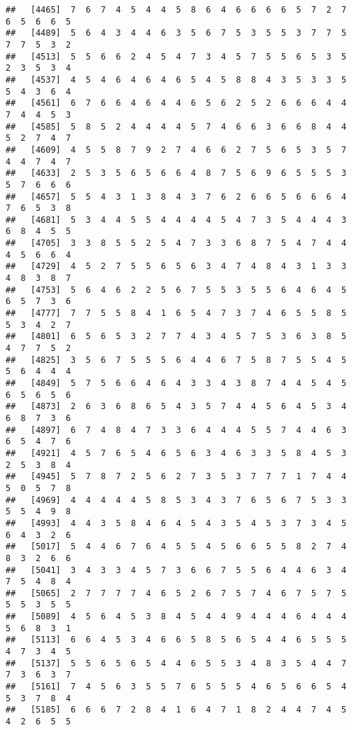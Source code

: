 \documentclass[
]{book}
\begin{document}
\begin{verbatim}
##   [4465]  7  6  7  4  5  4  4  5  8  6  4  6  6  6  6  5  7  2  7  6  5  6  6  5
##   [4489]  5  6  4  3  4  4  6  3  5  6  7  5  3  5  5  3  7  7  5  7  7  5  3  2
##   [4513]  5  5  6  6  2  4  5  4  7  3  4  5  7  5  5  6  5  3  5  2  3  5  3  4
##   [4537]  4  5  4  6  4  6  4  6  5  4  5  8  8  4  3  5  3  3  5  5  4  3  6  4
##   [4561]  6  7  6  6  4  6  4  4  6  5  6  2  5  2  6  6  6  4  4  7  4  4  5  3
##   [4585]  5  8  5  2  4  4  4  4  5  7  4  6  6  3  6  6  8  4  4  5  2  7  4  7
##   [4609]  4  5  5  8  7  9  2  7  4  6  6  2  7  5  6  5  3  5  7  4  4  7  4  7
##   [4633]  2  5  3  5  6  5  6  6  4  8  7  5  6  9  6  5  5  5  3  5  7  6  6  6
##   [4657]  5  5  4  3  1  3  8  4  3  7  6  2  6  6  5  6  6  6  4  7  6  5  3  8
##   [4681]  5  3  4  4  5  5  4  4  4  4  5  4  7  3  5  4  4  4  3  6  8  4  5  5
##   [4705]  3  3  8  5  5  2  5  4  7  3  3  6  8  7  5  4  7  4  4  4  5  6  6  4
##   [4729]  4  5  2  7  5  5  6  5  6  3  4  7  4  8  4  3  1  3  3  4  8  3  8  7
##   [4753]  5  6  4  6  2  2  5  6  7  5  5  3  5  5  6  4  6  4  5  6  5  7  3  6
##   [4777]  7  7  5  5  8  4  1  6  5  4  7  3  7  4  6  5  5  8  5  5  3  4  2  7
##   [4801]  6  5  6  5  3  2  7  7  4  3  4  5  7  5  3  6  3  8  5  4  7  7  5  2
##   [4825]  3  5  6  7  5  5  5  6  4  4  6  7  5  8  7  5  5  4  5  5  6  4  4  4
##   [4849]  5  7  5  6  6  4  6  4  3  3  4  3  8  7  4  4  5  4  5  6  5  6  5  6
##   [4873]  2  6  3  6  8  6  5  4  3  5  7  4  4  5  6  4  5  3  4  6  8  7  3  6
##   [4897]  6  7  4  8  4  7  3  3  6  4  4  4  5  5  7  4  4  6  3  6  5  4  7  6
##   [4921]  4  5  7  6  5  4  6  5  6  3  4  6  3  3  5  8  4  5  3  2  5  3  8  4
##   [4945]  5  7  8  7  2  5  6  2  7  3  5  3  7  7  7  1  7  4  4  5  0  5  7  8
##   [4969]  4  4  4  4  4  5  8  5  3  4  3  7  6  5  6  7  5  3  3  5  5  4  9  8
##   [4993]  4  4  3  5  8  4  6  4  5  4  3  5  4  5  3  7  3  4  5  6  4  3  2  6
##   [5017]  5  4  4  6  7  6  4  5  5  4  5  6  6  5  5  8  2  7  4  8  3  2  6  6
##   [5041]  3  4  3  3  4  5  7  3  6  6  7  5  5  6  4  4  6  3  4  7  5  4  8  4
##   [5065]  2  7  7  7  7  4  6  5  2  6  7  5  7  4  6  7  5  7  5  5  5  3  5  5
##   [5089]  4  5  6  4  5  3  8  4  5  4  4  9  4  4  4  6  4  4  4  5  6  8  3  1
##   [5113]  6  6  4  5  3  4  6  6  5  8  5  6  5  4  4  6  5  5  5  4  7  3  4  5
##   [5137]  5  5  6  5  6  5  4  4  6  5  5  3  4  8  3  5  4  4  7  7  3  6  3  7
##   [5161]  7  4  5  6  3  5  5  7  6  5  5  5  4  6  5  6  6  5  4  5  3  7  8  4
##   [5185]  6  6  6  7  2  8  4  1  6  4  7  1  8  2  4  4  7  4  5  4  2  6  5  5

\end{verbatim}
\end{document}
